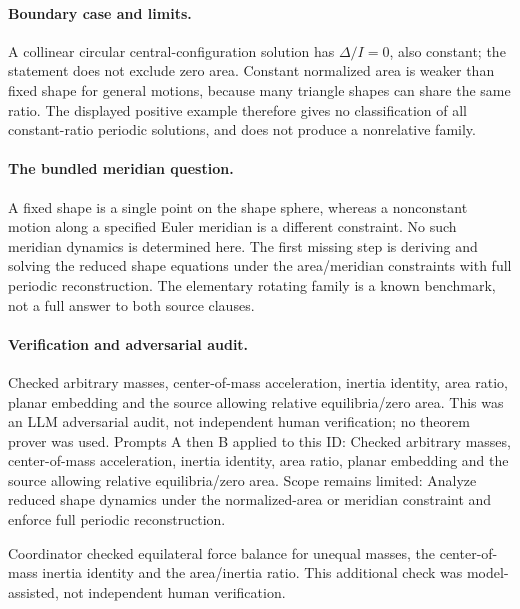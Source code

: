 \documentclass[11pt]{article}
\begin{document}
\paragraph{Boundary case and limits.}A collinear circular central-configuration solution has \(\Delta/I=0\), also constant; the statement does not exclude zero area. Constant normalized area is weaker than fixed shape for general motions, because many triangle shapes can share the same ratio. The displayed positive example therefore gives no classification of all constant-ratio periodic solutions, and does not produce a nonrelative family.
\paragraph{The bundled meridian question.}A fixed shape is a single point on the shape sphere, whereas a nonconstant motion along a specified Euler meridian is a different constraint. No such meridian dynamics is determined here. The first missing step is deriving and solving the reduced shape equations under the area/meridian constraints with full periodic reconstruction. The elementary rotating family is a known benchmark, not a full answer to both source clauses.

\paragraph{Verification and adversarial audit.}
Checked arbitrary masses, center-of-mass acceleration, inertia identity, area ratio, planar embedding and the source allowing relative equilibria/zero area. This was an LLM adversarial audit, not independent human verification; no theorem prover was used. Prompts A then B applied to this ID: Checked arbitrary masses, center-of-mass acceleration, inertia identity, area ratio, planar embedding and the source allowing relative equilibria/zero area. Scope remains limited: Analyze reduced shape dynamics under the normalized-area or meridian constraint and enforce full periodic reconstruction.

Coordinator checked equilateral force balance for unequal masses, the center-of-mass inertia identity and the area/inertia ratio. This additional check was model-assisted, not independent human verification.
\end{document}
